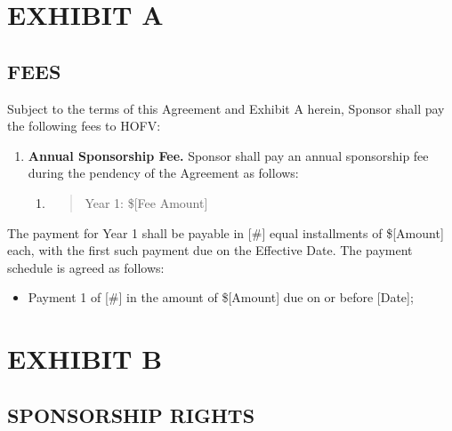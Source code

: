 \documentclass[
]{article}
\begin{document}
\newpage

\hypertarget{exhibit-a}{%
\section{EXHIBIT A}\label{exhibit-a}}

\hypertarget{fees}{%
\subsection{FEES}\label{fees}}

Subject to the terms of this Agreement and Exhibit A herein, Sponsor
shall pay the following fees to HOFV:

\begin{enumerate}
\def\labelenumi{\arabic{enumi}.}
\item
  \textbf{Annual Sponsorship Fee.} Sponsor shall pay an annual
  sponsorship fee during the pendency of the Agreement as follows:

  \begin{enumerate}
  \def\labelenumii{\alph{enumii}.}
  \item
    \begin{quote}
    Year 1: \${[}Fee Amount{]}
    \end{quote}
  \end{enumerate}
\end{enumerate}

The payment for Year 1 shall be payable in {[}\#{]} equal installments
of \${[}Amount{]} each, with the first such payment due on the Effective
Date. The payment schedule is agreed as follows:

\begin{itemize}
\item
  Payment 1 of {[}\#{]} in the amount of \${[}Amount{]} due on or before
  {[}Date{]};
\end{itemize}

\hypertarget{section}{%
\subsection{}\label{section}}

\newpage

\hypertarget{exhibit-b}{%
\section{EXHIBIT B}\label{exhibit-b}}

\hypertarget{sponsorship-rights}{%
\subsection{SPONSORSHIP RIGHTS}\label{sponsorship-rights}}
\end{document}
